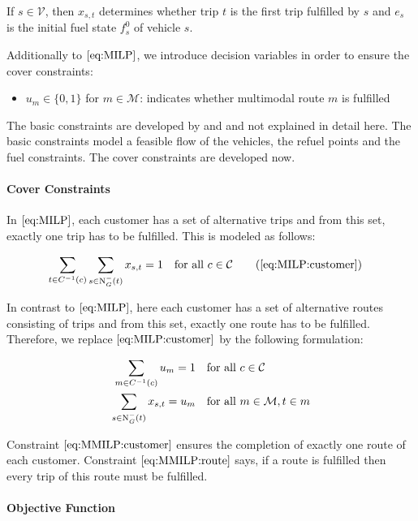 If $s\in\mathcal{V}$, then $x_{s,t}$ determines whether trip $t$ is the first trip fulfilled by $s$ and $e_s$ is the initial fuel state $f^0_s$ of vehicle $s$.

Additionally to $\eqref{eq:MILP}$, we introduce decision variables in order to ensure the cover constraints:

\begin{itemize}
	\item{$u_m\in\{0,1\}$ for $m\in\mathcal{M}$: indicates whether multimodal route $m$ is fulfilled}
\end{itemize}

The basic constraints are developed by \cite{Kaiser} and \cite{Knoll} and not explained in detail here. The basic constraints model a feasible flow of the vehicles, the refuel points and the fuel constraints. The cover constraints are developed now.

\paragraph{Cover Constraints} \parfill

In $\eqref{eq:MILP}$, each customer has a set of alternative trips and from this set, exactly one trip has to be fulfilled. This is modeled as follows:

\begin{align*}
	\sum_{t\in C^{-1}(c)} \sum_{s\in\Nin(t)} x_{s,t} = 1 &&& \text{for all } c\in\mathcal{C} \tag{\ref{eq:MILP:customer}}
\end{align*}

In contrast to $\eqref{eq:MILP}$, here each customer has a set of alternative routes consisting of trips and from this set, exactly one route has to be fulfilled. Therefore, we replace $\eqref{eq:MILP:customer}$ by the following formulation:

\begin{align}
	\sum_{m\in C^{-1}(c)} u_m = 1 &&& \text{for all } c\in\mathcal{C} \label{eq:MMILP:customer} \\
	\sum_{s\in\operatorname{N}_G^-(t)} x_{s,t} = u_m &&& \text{for all } m\in\mathcal{M}, t\in m \label{eq:MMILP:route}
\end{align}

Constraint $\eqref{eq:MMILP:customer}$ ensures the completion of exactly one route of each customer. Constraint $\eqref{eq:MMILP:route}$ says, if a route is fulfilled then every trip of this route must be fulfilled.

\paragraph{Objective Function} \parfill

